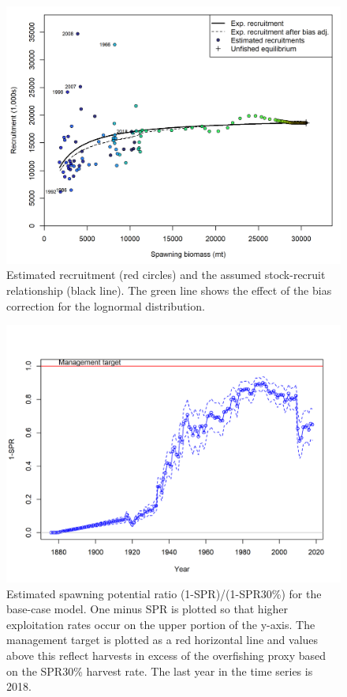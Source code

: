 \documentclass[12pt,]{article}
\begin{document}
\FloatBarrier

\begin{figure}
\centering
\includegraphics{r4ss/plots_mod1/SR_curve2.png}
\caption{Estimated recruitment (red circles) and the assumed
stock-recruit relationship (black line). The green line shows the effect
of the bias correction for the lognormal distribution.
\label{fig:stock_recruit_curve}}
\end{figure}

\FloatBarrier

\begin{figure}
\centering
\includegraphics{r4ss/plots_mod1/SPR3_ratiointerval.png}
\caption{Estimated spawning potential ratio (1-SPR)/(1-SPR30\%) for the
base-case model. One minus SPR is plotted so that higher exploitation
rates occur on the upper portion of the y-axis. The management target is
plotted as a red horizontal line and values above this reflect harvests
in excess of the overfishing proxy based on the SPR30\% harvest rate.
The last year in the time series is 2018. \label{fig:SPR}}
\end{figure}
\end{document}
